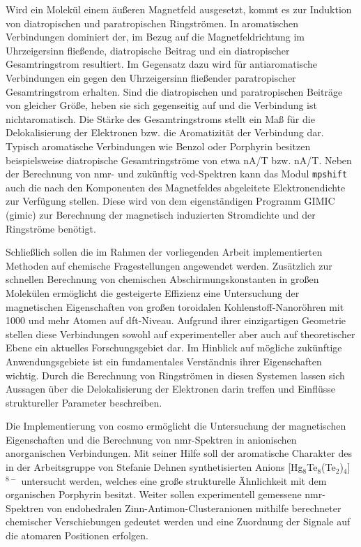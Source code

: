 \bigskip
Wird ein Molekül einem äußeren Magnetfeld ausgesetzt, kommt es zur Induktion von diatropischen und paratropischen Ringströmen.\supercite{taubert2011calculation} In aromatischen Verbindungen dominiert der, im Bezug auf die Magnetfeldrichtung im Uhrzeigersinn fließende, diatropische Beitrag und ein diatropischer Gesamtringstrom resultiert. Im Gegensatz dazu wird für antiaromatische Verbindungen ein gegen den Uhrzeigersinn fließender paratropischer Gesamtringstrom erhalten. Sind die diatropischen und paratropischen Beiträge von gleicher Größe, heben sie sich gegenseitig auf und die Verbindung ist nichtaromatisch. Die Stärke des Gesamtringstroms stellt ein Maß für die Delokalisierung der Elektronen bzw. die Aromatizität der Verbindung dar.\supercite{elvidge1961181,pople1966induced} Typisch aromatische Verbindungen wie Benzol oder Porphyrin besitzen beispielsweise diatropische Gesamtringströme von etwa \unit[12]{nA/T} bzw. \unit[27]{nA/T}.\supercite{fliegl2012aromatic} Neben der Berechnung von \ac{nmr}- und zukünftig \ac{vcd}-Spektren kann das Modul \texttt{mpshift} auch die nach den Komponenten des Magnetfeldes abgeleitete Elektronendichte zur Verfügung stellen. Diese wird von dem eigenständigen Programm GIMIC (\acl{gimic})\supercite{juselius2004calculation,taubert2011calculation,fliegl2011gauge,sundholm2016calculations} zur Berechnung der magnetisch induzierten Stromdichte und der Ringströme benötigt.

\bigskip
Schließlich sollen die im Rahmen der vorliegenden Arbeit implementierten Methoden auf chemische Fragestellungen angewendet werden. Zusätzlich zur schnellen Berechnung von chemischen Abschirmungskonstanten in großen Molekülen ermöglicht die gesteigerte Effizienz eine Untersuchung der magnetischen Eigenschaften von großen toroidalen Kohlenstoff-Nanoröhren mit 1000 und mehr Atomen auf \ac{dft}-Niveau. Aufgrund ihrer einzigartigen Geometrie stellen diese Verbindungen sowohl auf experimenteller aber auch auf theoretischer Ebene ein aktuelles Forschungsgebiet dar. Im Hinblick auf mögliche zukünftige Anwendungsgebiete ist ein fundamentales Verständnis ihrer Eigenschaften wichtig. Durch die Berechnung von Ringströmen in diesen Systemen lassen sich Aussagen über die Delokalisierung der Elektronen darin treffen und Einflüsse struktureller Parameter beschreiben. 

Die Implementierung von \ac{cosmo} ermöglicht die Untersuchung der magnetischen Eigenschaften und die Berechnung von \ac{nmr}-Spektren in anionischen anorganischen Verbindungen. Mit seiner Hilfe soll der aromatische Charakter des in der Arbeitsgruppe von Stefanie Dehnen synthetisierten Anions [Hg$_8$Te$_8$(Te$_2$)$_4$]$^{8-}$ untersucht werden, welches eine große strukturelle Ähnlichkeit mit dem organischen Porphyrin besitzt. Weiter sollen experimentell gemessene \ac{nmr}-Spektren von endohedralen Zinn-Antimon-Clusteranionen mithilfe berechneter chemischer Verschiebungen gedeutet werden und eine Zuordnung der Signale auf die atomaren Positionen erfolgen. 

